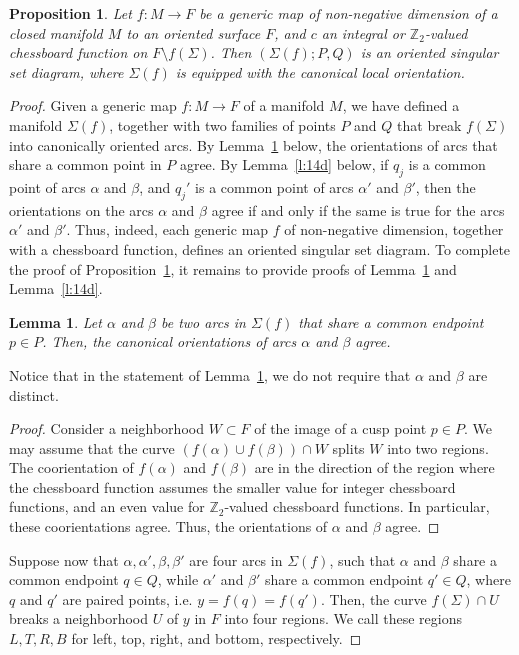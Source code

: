 \documentclass[12pt]{amsart}
\def \Z{\mathbb{Z}}
\def\co{\colon}
\newtheorem{lemma}[theorem]{Lemma}
\newtheorem{proposition}[theorem]{Proposition}
\theoremstyle{definition}
\begin{document}
\begin{proposition}\label{p:10a} Let $f\co M\to F$ be a generic map of non-negative dimension of a closed manifold $M$ to an oriented surface $F$, and $c$ an integral or $\Z_2$-valued chessboard function on $F \setminus f(\Sigma)$. Then $(\Sigma(f); P, Q)$ is an oriented singular set diagram, where $\Sigma(f)$ is equipped with the canonical local orientation. 
\end{proposition}
\begin{proof} Given a generic map $f\co M\to F$ of a manifold $M$, we have defined a manifold $\Sigma(f)$,  together with two families of points $P$ and $Q$ that break $f(\Sigma)$ into canonically oriented arcs. By Lemma~\ref{l:11d} below, the orientations of arcs that share a common point in $P$ agree. By Lemma~\ref{l:14d} below, if $q_j$ is a common point of arcs $\alpha$ and $\beta$, and $q_j'$ is a common point of arcs $\alpha'$ and $\beta'$, then the orientations on the arcs $\alpha$ and $\beta$ agree if and only if the same is true for the arcs $\alpha'$ and $\beta'$. Thus, indeed, each generic map $f$ of non-negative dimension,  together with a chessboard function,  defines an oriented singular set diagram.  To complete the proof of Proposition~\ref{p:10a}, it remains to provide proofs of Lemma~\ref{l:11d} and Lemma~\ref{l:14d}. 

\begin{lemma}\label{l:11d} Let $\alpha$ and $\beta$ be two arcs in $\Sigma(f)$ that share a common endpoint $p\in P$. Then, the canonical orientations of arcs $\alpha$ and $\beta$ agree. 
\end{lemma}

\noindent Notice that in the statement of Lemma~\ref{l:11d},  we do not require that $\alpha$ and $\beta$ are distinct. 

\begin{proof}
Consider a neighborhood  $W\subset F$  of the image of a cusp point $p \in P$.  We may assume that the curve $(f(\alpha) \cup f(\beta)) \cap W$ splits $W$ into two regions.  The coorientation of $f(\alpha)$ and $f(\beta)$ are in the direction of the region where the chessboard function assumes the smaller value for integer chessboard functions, and an even value for $\Z_2$-valued chessboard functions.  In particular,  these coorientations agree. Thus, the orientations of $\alpha$ and $\beta$ agree. 
\end{proof}


Suppose now that $\alpha, \alpha', \beta, \beta'$ are four arcs in $\Sigma(f)$,  such that $\alpha$ and $\beta$ share a common endpoint $q\in Q$, while $\alpha'$ and $\beta'$ share a common endpoint $q'\in Q$,  where $q$ and $q'$ are paired points,  i.e.  $y=f(q)=f(q')$.  Then,  the curve $f(\Sigma)\cap U$  breaks a neighborhood $U$ of $y$ in $F$ into four regions.  We call these regions $L, T, R, B$ for left,  top,  right, and bottom,  respectively.  




\end{proof}
\end{document}
